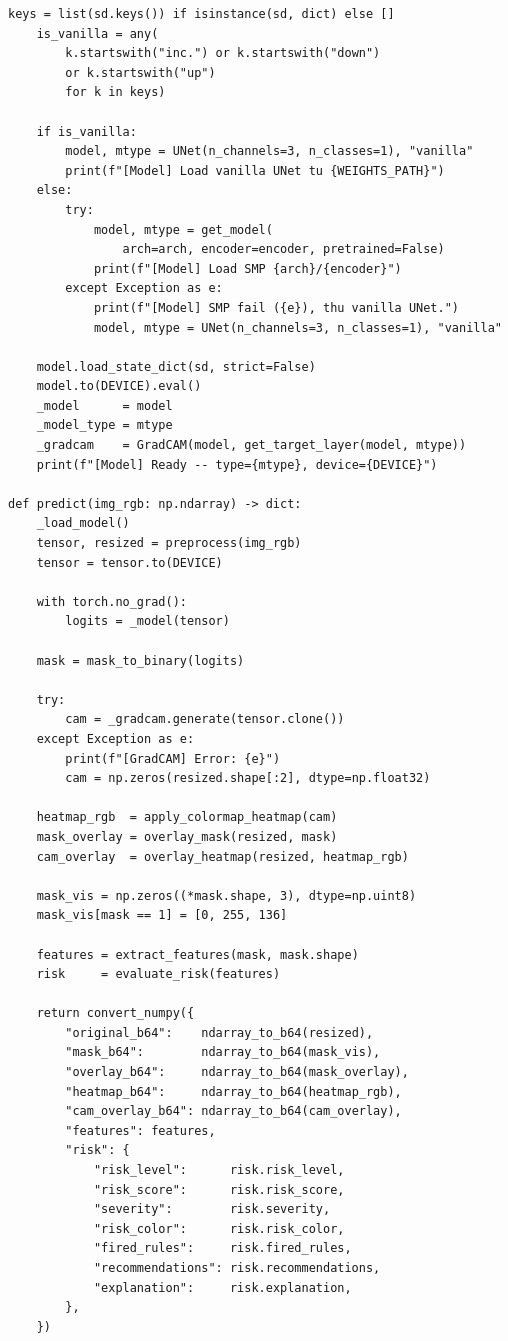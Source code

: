 \begin{lstlisting}[style=codePython, caption={Lazy model loading, auto-detect checkpoint va dieu phoi prediction pipeline (app/services/inference.py)}]
    keys = list(sd.keys()) if isinstance(sd, dict) else []
    is_vanilla = any(
        k.startswith("inc.") or k.startswith("down")
        or k.startswith("up")
        for k in keys)

    if is_vanilla:
        model, mtype = UNet(n_channels=3, n_classes=1), "vanilla"
        print(f"[Model] Load vanilla UNet tu {WEIGHTS_PATH}")
    else:
        try:
            model, mtype = get_model(
                arch=arch, encoder=encoder, pretrained=False)
            print(f"[Model] Load SMP {arch}/{encoder}")
        except Exception as e:
            print(f"[Model] SMP fail ({e}), thu vanilla UNet.")
            model, mtype = UNet(n_channels=3, n_classes=1), "vanilla"

    model.load_state_dict(sd, strict=False)
    model.to(DEVICE).eval()
    _model      = model
    _model_type = mtype
    _gradcam    = GradCAM(model, get_target_layer(model, mtype))
    print(f"[Model] Ready -- type={mtype}, device={DEVICE}")

def predict(img_rgb: np.ndarray) -> dict:
    _load_model()
    tensor, resized = preprocess(img_rgb)
    tensor = tensor.to(DEVICE)

    with torch.no_grad():
        logits = _model(tensor)

    mask = mask_to_binary(logits)

    try:
        cam = _gradcam.generate(tensor.clone())
    except Exception as e:
        print(f"[GradCAM] Error: {e}")
        cam = np.zeros(resized.shape[:2], dtype=np.float32)

    heatmap_rgb  = apply_colormap_heatmap(cam)
    mask_overlay = overlay_mask(resized, mask)
    cam_overlay  = overlay_heatmap(resized, heatmap_rgb)

    mask_vis = np.zeros((*mask.shape, 3), dtype=np.uint8)
    mask_vis[mask == 1] = [0, 255, 136]

    features = extract_features(mask, mask.shape)
    risk     = evaluate_risk(features)

    return convert_numpy({
        "original_b64":    ndarray_to_b64(resized),
        "mask_b64":        ndarray_to_b64(mask_vis),
        "overlay_b64":     ndarray_to_b64(mask_overlay),
        "heatmap_b64":     ndarray_to_b64(heatmap_rgb),
        "cam_overlay_b64": ndarray_to_b64(cam_overlay),
        "features": features,
        "risk": {
            "risk_level":      risk.risk_level,
            "risk_score":      risk.risk_score,
            "severity":        risk.severity,
            "risk_color":      risk.risk_color,
            "fired_rules":     risk.fired_rules,
            "recommendations": risk.recommendations,
            "explanation":     risk.explanation,
        },
    })
\end{lstlisting}

